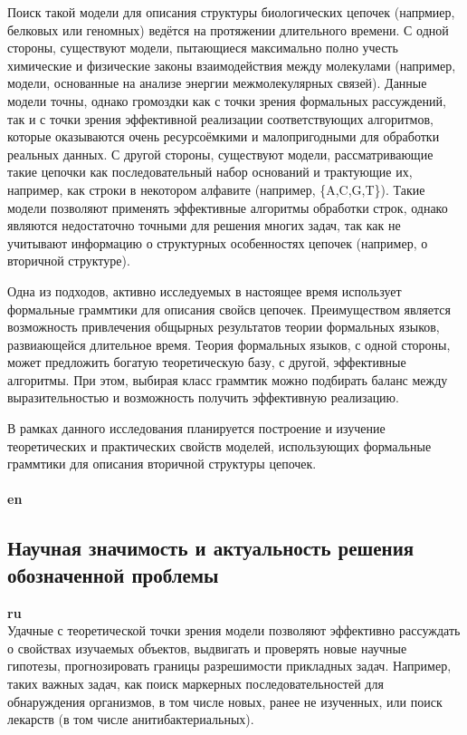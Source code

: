 \documentclass[12pt]{article}  %
\theoremstyle{remark}
\begin{document}
Поиск такой модели для описания структуры биологических цепочек (напрмиер, белковых или геномных) ведётся на протяжении длительного времени.
С одной стороны, существуют модели, пытающиеся максимально полно учесть химические и физические законы взаимодействия между молекулами (например, модели, основанные на анализе энергии межмолекулярных связей).
Данные модели точны, однако громоздки как с точки зрения формальных рассуждений, так и с точки зрения эффективной реализации соответствующих алгоритмов, которые оказываются очень ресурсоёмкими и малопригодными для обработки реальных данных.
С другой стороны, существуют модели, рассматривающие такие цепочки как последовательный набор оснований и трактующие их, например, как строки в некотором алфавите (например, \{A,C,G,T\}).
Такие модели позволяют применять эффективные алгоритмы обработки строк, однако являются недостаточно точными для решения многих задач, так как не учитывают информацию о структурных особенностях цепочек (например, о вторичной структуре).

Одна из подходов, активно исследуемых в настоящее время использует формальные граммтики для описания свойсв цепочек.
Преимуществом является возможность привлечения общырных результатов теории формальных языков, развиающейся длительное время.
Теория формальных языков, с одной стороны, может предложить богатую теоретическую базу, с другой, эффективные алгоритмы.
При этом, выбирая класс граммтик можно подбирать баланс между выразительностью и возможность получить эффективную реализацию.

В рамках данного исследования планируется построение и изучение теоретических и практических свойств моделей, использующих формальные граммтики для описания вторичной структуры цепочек.
\\
\\
\textbf{en}\\



\subsection{Научная значимость и актуальность решения обозначенной проблемы}

\textbf{ru}\\
Удачные с теоретической точки зрения модели позволяют эффективно рассуждать о свойствах изучаемых объектов, выдвигать и проверять новые научные гипотезы, прогнозировать границы разрешимости прикладных задач. Например, таких важных задач, как поиск маркерных последовательностей для обнаруждения организмов, в том числе новых, ранее не изученных, или поиск лекарств (в том числе анитибактериальных).
\end{document}
